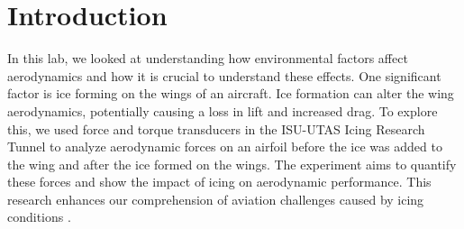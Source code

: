 \chapter{Introduction} \label{cp:introduction}

In this lab, we looked at understanding how environmental factors affect aerodynamics and how it is crucial to understand these effects. One significant factor is ice forming on the wings of an aircraft. Ice formation can alter the wing aerodynamics, potentially causing a loss in lift and increased drag. To explore this, we used force and torque transducers in the ISU-UTAS Icing Research Tunnel to analyze aerodynamic forces on an airfoil before the ice was added to the wing and after the ice formed on the wings. The experiment aims to quantify these forces and show the impact of icing on aerodynamic performance. This research enhances our comprehension of aviation challenges caused by icing conditions \citep{lab12-manual}.